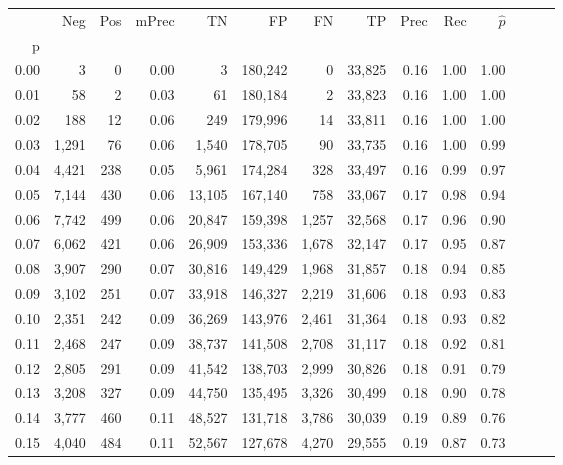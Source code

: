 \begin{tabular}{rrrrrrrrrrrrrr}
\toprule
{} &    Neg &  Pos & mPrec &       TN &       FP &      FN &      TP &  Prec &   Rec & $\hat{p}$ \\
p    &        &      &       &          &          &         &         &       &       &           \\
\midrule
0.00 &      3 &    0 &  0.00 &        3 &  180,242 &       0 &  33,825 &  0.16 &  1.00 &      1.00 \\
0.01 &     58 &    2 &  0.03 &       61 &  180,184 &       2 &  33,823 &  0.16 &  1.00 &      1.00 \\
0.02 &    188 &   12 &  0.06 &      249 &  179,996 &      14 &  33,811 &  0.16 &  1.00 &      1.00 \\
0.03 &  1,291 &   76 &  0.06 &    1,540 &  178,705 &      90 &  33,735 &  0.16 &  1.00 &      0.99 \\
0.04 &  4,421 &  238 &  0.05 &    5,961 &  174,284 &     328 &  33,497 &  0.16 &  0.99 &      0.97 \\
0.05 &  7,144 &  430 &  0.06 &   13,105 &  167,140 &     758 &  33,067 &  0.17 &  0.98 &      0.94 \\
0.06 &  7,742 &  499 &  0.06 &   20,847 &  159,398 &   1,257 &  32,568 &  0.17 &  0.96 &      0.90 \\
0.07 &  6,062 &  421 &  0.06 &   26,909 &  153,336 &   1,678 &  32,147 &  0.17 &  0.95 &      0.87 \\
0.08 &  3,907 &  290 &  0.07 &   30,816 &  149,429 &   1,968 &  31,857 &  0.18 &  0.94 &      0.85 \\
0.09 &  3,102 &  251 &  0.07 &   33,918 &  146,327 &   2,219 &  31,606 &  0.18 &  0.93 &      0.83 \\
0.10 &  2,351 &  242 &  0.09 &   36,269 &  143,976 &   2,461 &  31,364 &  0.18 &  0.93 &      0.82 \\
0.11 &  2,468 &  247 &  0.09 &   38,737 &  141,508 &   2,708 &  31,117 &  0.18 &  0.92 &      0.81 \\
0.12 &  2,805 &  291 &  0.09 &   41,542 &  138,703 &   2,999 &  30,826 &  0.18 &  0.91 &      0.79 \\
0.13 &  3,208 &  327 &  0.09 &   44,750 &  135,495 &   3,326 &  30,499 &  0.18 &  0.90 &      0.78 \\
0.14 &  3,777 &  460 &  0.11 &   48,527 &  131,718 &   3,786 &  30,039 &  0.19 &  0.89 &      0.76 \\
0.15 &  4,040 &  484 &  0.11 &   52,567 &  127,678 &   4,270 &  29,555 &  0.19 &  0.87 &      0.73 \\

\end{tabular}

